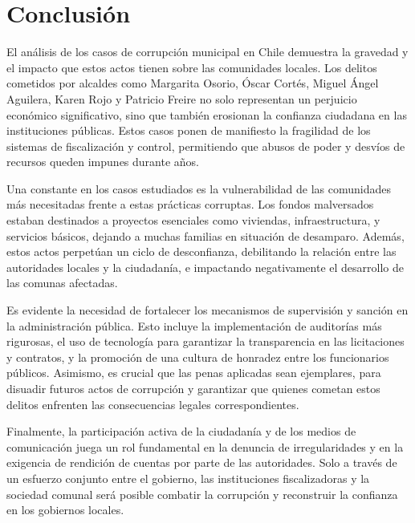 \documentclass[letter,12pt]{article}
\begin{document}
	\section{Conclusión}
	
	El análisis de los casos de corrupción municipal en Chile demuestra la gravedad y el impacto que estos actos tienen sobre las comunidades locales. Los delitos cometidos por alcaldes como Margarita Osorio, Óscar Cortés, Miguel Ángel Aguilera, Karen Rojo y Patricio Freire no solo representan un perjuicio económico significativo, sino que también erosionan la confianza ciudadana en las instituciones públicas. Estos casos ponen de manifiesto la fragilidad de los sistemas de fiscalización y control, permitiendo que abusos de poder y desvíos de recursos queden impunes durante años.
	
	Una constante en los casos estudiados es la vulnerabilidad de las comunidades más necesitadas frente a estas prácticas corruptas. Los fondos malversados estaban destinados a proyectos esenciales como viviendas, infraestructura, y servicios básicos, dejando a muchas familias en situación de desamparo. Además, estos actos perpetúan un ciclo de desconfianza, debilitando la relación entre las autoridades locales y la ciudadanía, e impactando negativamente el desarrollo de las comunas afectadas.
	
	Es evidente la necesidad de fortalecer los mecanismos de supervisión y sanción en la administración pública. Esto incluye la implementación de auditorías más rigurosas, el uso de tecnología para garantizar la transparencia en las licitaciones y contratos, y la promoción de una cultura de honradez entre los funcionarios públicos. Asimismo, es crucial que las penas aplicadas sean ejemplares, para disuadir futuros actos de corrupción y garantizar que quienes cometan estos delitos enfrenten las consecuencias legales correspondientes.
	
	Finalmente, la participación activa de la ciudadanía y de los medios de comunicación juega un rol fundamental en la denuncia de irregularidades y en la exigencia de rendición de cuentas por parte de las autoridades. Solo a través de un esfuerzo conjunto entre el gobierno, las instituciones fiscalizadoras y la sociedad comunal será posible combatir la corrupción y reconstruir la confianza en los gobiernos locales.
	
	
	\newpage
	\printbibliography[heading=bibintoc, title=Referencias]
	
\end{document}
